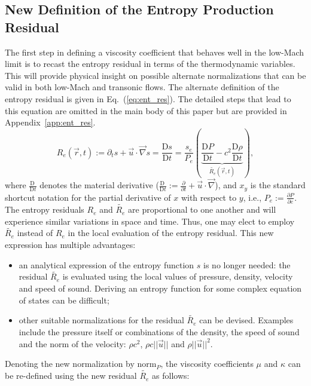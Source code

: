 \documentclass[preprint,10pt]{elsarticle}
\newcommand{\grad}{\vec{\nabla}}
\newcommand{\norm}{\textrm{norm}}
\newcommand{\resi}{R_e}
\newcommand{\resinew}{\widetilde{\resi}}
\newcommand{\matder}[1]{\frac{\textrm{D} #1}{\textrm{D} t}}
\newcommand{\eqt}[1]{Eq.~(\ref{#1})}                     %
\newcommand{\app}[1]{Appendix~\ref{#1}}                   %
\begin{document}
\subsection{New Definition of the Entropy Production Residual}\label{sec:new_ent_prod} 

The first step in defining a viscosity coefficient that behaves well in the low-Mach limit is to recast the entropy residual in terms of the thermodynamic variables. This will provide physical insight on possible alternate normalizations that can be valid in both low-Mach and transonic flows. The alternate definition of the entropy residual is given in \eqt{eq:ent_res}. The detailed steps that lead to this equation are omitted in the main body of this paper but are provided in \app{app:ent_res}. 
%
\begin{equation}
\label{eq:ent_res}
\resi(\vec{r},t) := \partial_t s + \vec{u} \cdot \grad s = \matder{s} = \frac{s_e}{P_e} \left( \underbrace{\matder{P} - c^2 \matder{\rho} }_{\resinew(\vec{r},t)} \right) ,
\end{equation} 
%
where $\matder{\ }$ denotes the material derivative ($\matder{\ }:= \frac{\partial}{\partial t} + \vec{u} \cdot \grad$), and $x_y$ is the standard shortcut notation for the partial derivative of $x$ with respect to $y$, i.e., $P_e:=\frac{\partial P}{\partial e}$. 
%
The entropy residuals $\resi$ and $\resinew$ are proportional to one another and will experience similar variations in space and time. Thus, one may elect to employ $\resinew$ instead of $\resi$ in the local evaluation of the entropy residual. This new expression has multiple advantages:
%
\begin{itemize}
\item an analytical expression of the entropy function $s$ is no longer needed: the residual $\resinew$ is evaluated using the local values of pressure, density, velocity and speed of sound. Deriving an entropy function for some complex equation of states can be difficult;
\item other suitable normalizations for the residual $\resinew$ can be devised. Examples include the pressure itself or combinations of the density, the speed of sound and the norm of the velocity: $\rho c^2$, $\rho c || \vec{u} ||$ and $\rho || \vec{u} ||^2$. 
\end{itemize}
%
Denoting the new normalization by $\norm_P$, the viscosity coefficients $\mu$ and $\kappa$ can be re-defined using the new residual $\resinew$ as follows:
\end{document}
